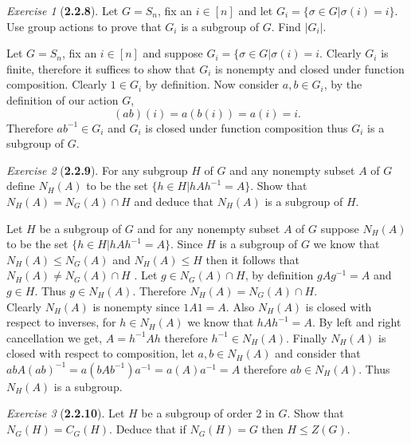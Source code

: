 \documentclass[12pt]{amsart}
\makeatletter
\theoremstyle{remark}
\newtheorem*{exercise}{Exercise}%
\renewenvironment{proof}[1][\proofname]{\par\doublespacing
  \pushQED{\qed}%
  \normalfont \topsep6\p@\@plus6\p@\relax
  \list{}{%
    \settowidth{\leftmargin}{\itshape\proofname:\hskip\labelsep}%
    \setlength{\labelwidth}{0pt}%
    \setlength{\itemindent}{-\leftmargin}%
  }%
  \item[\hskip\labelsep\itshape#1\@addpunct{:}]\ignorespaces
}{%
  \popQED\endlist\@endpefalse
  \singlespacing
}
\theoremstyle{mycomment}
\makeatother
\begin{document}
\begin{exercise}[\textbf{2.2.8}] Let $G = S_n$, fix an $i \in [n]$ and let $G_i = \{\sigma \in G | \sigma (i) = i \}$. Use group actions to prove that $G_i$ is 
  a subgroup of $G$. Find $|G_i|$.
    \begin{proof} Let $G = S_n$, fix an $i \in [n]$ and suppose $G_i = \{\sigma \in G | \sigma (i) = i$. Clearly $G_i$ is finite, therefore it suffices to show that 
      $G_i$ is nonempty and closed under function composition. Clearly $1 \in G_i$ by definition. Now consider $a, b \in G_i$, by the definition of our action $G$, 
      \begin{equation*}
        (ab)(i) =a(b(i)) = a(i) = i.  
      \end{equation*}
      Therefore $ab^{-1} \in G_i$ and $G_i$ is closed under function composition thus $G_i$ is a subgroup of $G$. 
    \end{proof}
\end{exercise}
\vspace{.15in}


\begin{exercise}[\textbf{2.2.9}] For any subgroup $H$ of $G$ and any nonempty subset $A$ of $G$ define $N_H(A)$ to be the set $\{h \in H | hAh^{-1} = A\}$. Show that 
  $N_H(A) = N_G(A)\cap H$ and deduce that $N_H(A)$ is a subgroup of $H$. 
    \begin{proof} Let $H$ be a subgroup of $G$ and for any nonempty subset $A$ of $G$ suppose $N_H(A)$ to be the set $\{h \in H | hAh^{-1} = A\}$. Since $H$ is 
      a subgroup of $G$ we know that $N_H(A) \leq N_G(A)$ and $N_H(A) \leq H$ then it follows that $N_H(A) \neq N_G(A)\cap H$ . Let $g \in N_G(A) \cap H$, by definition $gAg^{-1} = A$ and $g \in H$. Thus $g \in N_H(A)$. Therefore $N_H(A) = N_G(A)\cap H$.\\

      Clearly $N_H(A)$ is nonempty since $1A1 = A$. Also $N_H(A)$ is closed with respect to inverses, for $h \in N_H(A)$ we know that $hAh^{-1} = A$. By left and right cancellation we get, $A= h^{-1}Ah$ therefore $h^{-1} \in N_H(A)$.
      Finally $N_H(A)$ is closed with respect to composition, let $a, b \in  N_H(A)$ and consider that $abA(ab)^{-1} = a(bAb^{-1})a^{-1} = a(A)a^{-1} = A$ therefore $ab \in N_H(A)$. Thus $N_H(A)$ is a subgroup. 
    \end{proof}
\end{exercise}
\vspace{.15in}

\begin{exercise}[\textbf{2.2.10}] Let $H$ be a subgroup of order 2 in $G$. Show that $N_G(H) = C_G(H)$. Deduce that if $N_G(H) = G$ then $H \leq Z(G)$.
    \begin{proof} 

    \end{proof}
\end{exercise}
\vspace{.15in}
\end{document}
